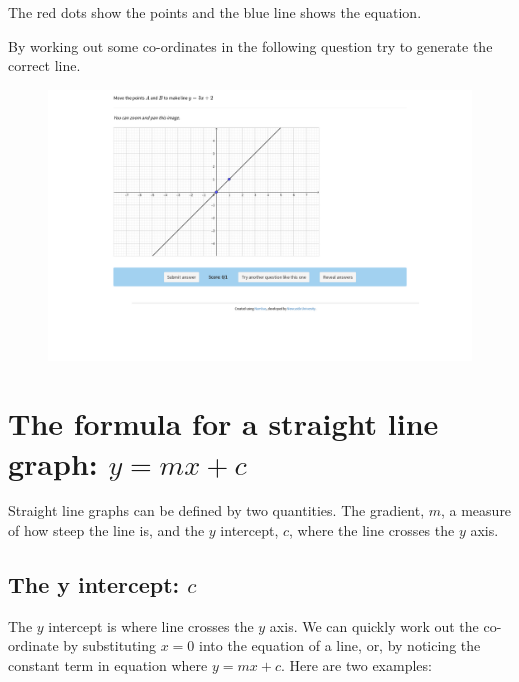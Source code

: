\documentclass[
  a4paper,
]{scrbook}
\begin{document}
The red dots show the points and the blue line shows the equation.

By working out some co-ordinates in the following question try to
generate the correct line.

\begin{figure}

{\centering 

\href{https://numbas.mathcentre.ac.uk/question/68532/linear-graphs-plotting-1-integer-values/embed/?token=c4963f30-f814-4d6f-91bc-b631f0ed1ec3}{\includegraphics{./06-straight_line_graphs_files/figure-pdf/unnamed-chunk-3-1.png}}

}

\end{figure}

\hypertarget{the-formula-for-a-straight-line-graph-ymxc}{%
\section{\texorpdfstring{The formula for a straight line graph:
\(y=mx+c\)}{The formula for a straight line graph: y=mx+c}}\label{the-formula-for-a-straight-line-graph-ymxc}}

Straight line graphs can be defined by two quantities. The gradient,
\(m\), a measure of how steep the line is, and the \(y\) intercept,
\(c\), where the line crosses the \(y\) axis.

\hypertarget{the-y-intercept-c}{%
\subsection{\texorpdfstring{The y intercept:
\(c\)}{The y intercept: c}}\label{the-y-intercept-c}}

The \(y\) intercept is where line crosses the \(y\) axis. We can quickly
work out the co-ordinate by substituting \(x=0\) into the equation of a
line, or, by noticing the constant term in equation where \(y=mx+c\).
Here are two examples:
\end{document}
